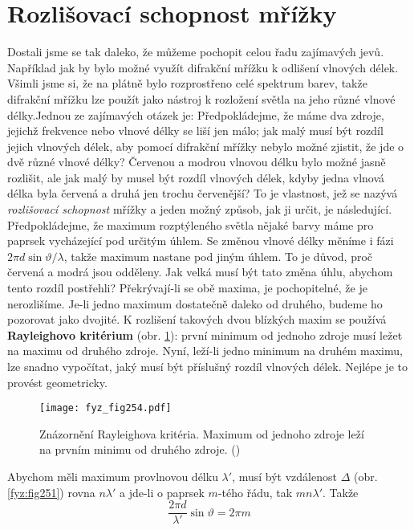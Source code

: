 {  \section{Rozlišovací schopnost mřížky}\label{fyz:IchapXXXsecIII}
    Dostali jsme se tak daleko, že můžeme pochopit celou řadu zajímavých jevů. Například jak by 
    bylo možné využít difrakční mřížku k odlišení vlnových délek. Všimli jsme si, že na plátně bylo 
    rozprostřeno celé spektrum barev, takže difrakční mřížku lze použít jako nástroj k rozložení 
    světla na jeho různé vlnové délky.Jednou ze zajímavých otázek je: Předpokládejme, že máme dva 
    zdroje, jejichž frekvence nebo vlnové délky se liší jen málo; jak malý musí být rozdíl jejich 
    vlnových délek, aby pomocí difrakční mřížky nebylo možné zjistit, že jde o dvě různé vlnové 
    délky? Červenou a modrou vlnovou délku bylo možné jasně rozlišit, ale jak malý by musel být 
    rozdíl vlnových délek, kdyby jedna vlnová délka byla červená a druhá jen trochu červenější? To 
    je vlastnost, jež se nazývá \emph{rozlišovací schopnost} mřížky a jeden možný způsob, jak ji 
    určit, je následující. Předpokládejme, že maximum rozptýleného světla nějaké barvy máme pro 
    paprsek vycházející pod určitým úhlem. Se změnou vlnové délky měníme i fázi \(2\pi 
    d\sin\vartheta/\lambda\), takže maximum nastane pod jiným úhlem. To je důvod, proč červená a 
    modrá jsou odděleny. Jak velká musí být tato změna úhlu, abychom tento rozdíl postřehli? 
    Překrývají-li se obě maxima, je pochopitelné, že je nerozlišíme. Je-li jedno maximum dostatečně 
    daleko od druhého, budeme ho pozorovat jako dvojité. K rozlišení takových dvou blízkých maxim 
    se používá \textbf{Rayleighovo kritérium} (obr. \ref{fyz:fig254}): první minimum od jednoho 
    zdroje musí ležet na maximu od druhého zdroje. Nyní, leží-li jedno minimum na druhém maximu, 
    lze snadno vypočítat, jaký musí být příslušný rozdíl vlnových délek. Nejlépe je to provést 
    geometricky.
    
    \begin{figure}[ht!] %
      \centering
      \texttt{[image: fyz\_fig254.pdf]}
      \caption{Znázornění Rayleighova kritéria. Maximum od jednoho zdroje leží na prvním minimu od 
               druhého zdroje.
               (\cite[s.~399]{Feynman01})}
      \label{fyz:fig254}
    \end{figure}
    
    Abychom měli maximum provlnovou délku \(\lambda'\), musí být vzdálenost \(\Delta\) (obr. 
    \ref{fyz:fig251}) rovna \(n\lambda'\) a jde-li o paprsek \(m\)-tého řádu, tak \(mn\lambda'\). 
    Takže
    \begin{equation*}
      \dfrac{2\pi d}{\lambda'}\sin\vartheta =2\pi m 
    \end{equation*}
    
}
